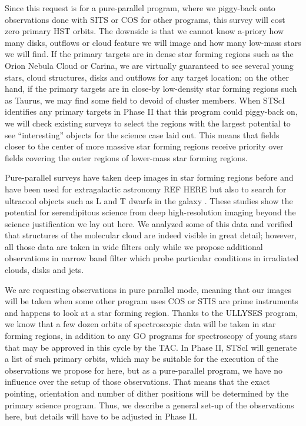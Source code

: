 \documentclass[12pt]{article}
\begin{document}
Since this request is for a pure-parallel program, where we piggy-back onto observations done with SITS or COS for other programs, this survey will cost zero primary HST orbits. The downside is that we cannot know a-priory how many disks, outflows or cloud feature we will image and how many low-mass stars we will find. If the primary targets are in dense star forming regions such as the Orion Nebula Cloud or Carina, we are virtually guaranteed to see several young stars, cloud structures, disks and outflows for any target location; on the other hand, if the primary targets are in close-by low-density star forming regions such as Taurus, we may find some field to devoid of cluster members. When STScI identifies any primary targets in Phase II that this program could piggy-back on, we will check existing surveys to select the regions with the largest potential to see ``interesting'' objects for the science case laid out. This means that fields closer to the center of more massive star forming regions receive priority over fields covering the outer regions of lower-mass star forming regions.

Pure-parallel surveys have taken deep images in star forming regions before and have been used for extragalactic astronomy REF HERE but also to search for ultracool objects such as L and T dwarfs in the galaxy \citep{2005ApJ...631L.159R}. These studies show the potential for serendipitous science from deep high-resolution imaging beyond the science justification we lay out here. We analyzed some of this data and verified that structures of the molecular cloud are indeed visible in great detail; however, all those data are taken in wide filters only while we propose additional observations in narrow band filter which probe particular conditions in irradiated clouds, disks and jets.


%
%
\describeobservations   %
We are requesting observations in pure parallel mode, meaning that our images will be taken when some other program uses COS or STIS are prime instruments and happens to look at a star forming region. Thanks to the ULLYSES program, we know that a few dozen orbits of spectroscopic data will be taken in star forming regions, in addition to any GO programs for spectroscopy of young stars that may be approved in this cycle by the TAC. In Phase II, STScI will generate a list of such primary orbits, which may be suitable for the execution of the observations we propose for here, but as a pure-parallel program, we have no influence over the setup of those observations. That means that the exact pointing, orientation and number of dither positions will be determined by the primary science program. Thus, we describe a general set-up of the observations here, but details will have to be adjusted in Phase II.
\end{document}

